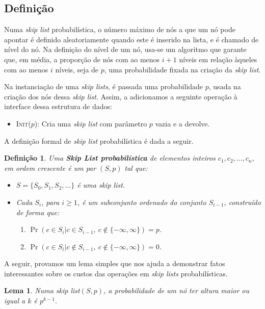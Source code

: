 \documentclass[paper=a4, fontsize=11pt]{scrartcl} %
\newtheorem{definition}{Definição}
\newtheorem{lemma}[theorem]{Lema}
\numberwithin{equation}{section}
\numberwithin{figure}{section}
\numberwithin{table}{section}
\numberwithin{definition}{section}
\numberwithin{theorem}{section}
\numberwithin{property}{section}
\numberwithin{proposition}{section}
\newcommand{\sls}{\textit{skip lists}\xspace}
\newcommand{\skl}{\textit{skip list}\xspace}
\renewcommand{\sl}{\textit{skip list}\xspace}
\begin{document}
\subsection{Definição}

Numa \sl probabilística, o número máximo de nós a que um nó pode apontar é definido 
aleatoriamente quando este é inserido na lista, e é chamado de nível do nó.
Na definição do nível de um nó, usa-se um algoritmo que garante que, em média, a proporção 
de nós com ao menos $i + 1$ níveis em relação àqueles com ao menos $i$ níveis, seja de $p$, uma probabilidade
fixada na criação da \sl.

Na instanciação de uma \sls, é passada uma probabilidade $p$, usada na criação dos nós dessa \sl.
Assim, a adicionamos a seguinte operação à interface dessa estrutura de dados:

\begin{itemize}
  \item \textsc{Init}($p$): Cria uma \skl com parâmetro $p$ vazia e a devolve.
\end{itemize}

A definição formal de \sl probabilística é dada a seguir.

\begin{definition}
Uma \textbf{\emph{Skip List} probabilística} de elementos inteiros $c_1, c_2, \ldots, c_n$, 
em ordem crescente é um par $\left( S, p \right)$ tal que:

\begin{itemize}

\item $S = \{S_0, S_1, S_2, \ldots \}$ é uma \sl.

\item Cada $S_i$, para $i \geq 1$, é um subconjunto ordenado do conjunto $S_{i-1}$, 
construído de forma que:
  \begin{enumerate}[noitemsep]
    \item $\Pr(c \in S_i | c \in S_{i-1} ,\  c \notin \{-\infty, \infty\}) = p$.
    \item  $\Pr(c \in S_i | c \notin S_{i-1}, \ c \notin \{-\infty, \infty\}) = 0$.
  \end{enumerate}

\end{itemize}

\end{definition}


A seguir, provamos um lema simples que nos ajuda a demonstrar fatos interessantes sobre os custos das
operações em \sls probabilísticas.
\begin{lemma} \label{lemma:prob_of_node_height}
 Numa \sl $(S, p)$, a probabilidade de um nó ter altura maior ou igual a $k$ é $p^{k - 1}$.

\end{lemma}
\end{document}
